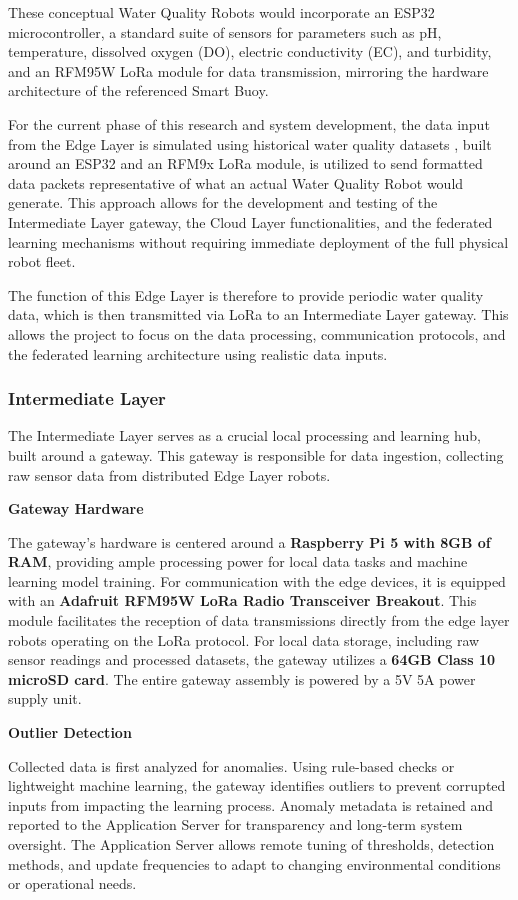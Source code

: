 These conceptual Water Quality Robots would incorporate an ESP32 microcontroller, a standard suite of sensors for parameters such as pH, temperature, dissolved oxygen (DO), electric conductivity (EC), and turbidity, and an RFM95W LoRa module for data transmission, mirroring the hardware architecture of the referenced Smart Buoy.

For the current phase of this research and system development, the data input from the Edge Layer is simulated using historical water quality datasets , built around an ESP32 and an RFM9x LoRa module, is utilized to send formatted data packets representative of what an actual Water Quality Robot would generate. This approach allows for the development and testing of the Intermediate Layer gateway, the Cloud Layer functionalities, and the federated learning mechanisms without requiring immediate deployment of the full physical robot fleet.

The function of this Edge Layer is therefore to provide periodic water quality data, which is then transmitted via LoRa to an Intermediate Layer gateway. This allows the project to focus on the data processing, communication protocols, and the federated learning architecture using realistic data inputs.
\subsubsection{Intermediate Layer}
\label{sssec:intermediate_layer_detail} %
The Intermediate Layer serves as a crucial local processing and learning hub, built around a gateway. This gateway is responsible for data ingestion, collecting raw sensor data from distributed Edge Layer robots.

\textbf{Gateway Hardware}

The gateway's hardware is centered around a \textbf{Raspberry Pi 5 with 8GB of RAM}, providing ample processing power for local data tasks and machine learning model training. For communication with the edge devices, it is equipped with an \textbf{Adafruit RFM95W LoRa Radio Transceiver Breakout}. This module facilitates the reception of data transmissions directly from the edge layer robots operating on the LoRa protocol. For local data storage, including raw sensor readings and processed datasets, the gateway utilizes a \textbf{64GB Class 10 microSD card}. The entire gateway assembly is powered by a 5V 5A power supply unit.


\textbf{Outlier Detection}

Collected data is first analyzed for anomalies. Using rule-based checks or lightweight machine learning, the gateway identifies outliers to prevent corrupted inputs from impacting the learning process. Anomaly metadata is retained and reported to the Application Server for transparency and long-term system oversight. The Application Server allows remote tuning of thresholds, detection methods, and update frequencies to adapt to changing environmental conditions or operational needs.

